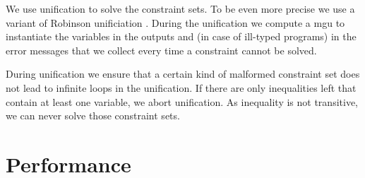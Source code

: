 We use unification to solve the constraint sets. To be even more
precise we use a variant of Robinson unificiation
. During the unification we compute a \gls{mgu} to
instantiate the variables in the outputs and (in case of ill-typed
programs) in the error messages that we collect every time a
constraint cannot be solved.

During unification we ensure that a certain kind of malformed
constraint set does not lead to infinite loops in the unification. If
there are only inequalities left that contain at least one variable,
we abort unification. As inequality is not transitive, we can never
solve those constraint sets.
\section{Performance}
\label{sec:performance}

